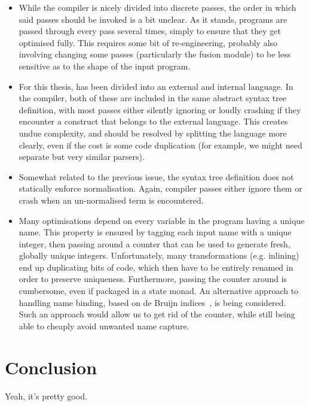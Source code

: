 \begin{itemize}
\item While the compiler is nicely divided into discrete passes, the
  order in which said passes should be invoked is a bit unclear.  As
  it stands, programs are passed through every pass several times,
  simply to ensure that they get optimised fully.  This requires some
  bit of re-engineering, probably also involving changing some passes
  (particularly the fusion module) to be less sensitive as to the
  shape of the input program.

\item For this thesis, \LO{} has been divided into an external and
  internal language.  In the compiler, both of these are included in
  the same abstract syntax tree definition, with most passes either
  silently ignoring or loudly crashing if they encounter a construct
  that belongs to the external language.  This creates undue
  complexity, and should be resolved by splitting the language more
  clearly, even if the cost is some code duplication (for example, we
  might need separate but very similar parsers).

\item Somewhat related to the previous issue, the \LO{} syntax tree
  definition does not statically enforce normalisation.  Again,
  compiler passes either ignore them or crash when an un-normalised
  term is encountered.

\item Many optimisations depend on every variable in the program
  having a unique name.  This property is ensured by tagging each
  input name with a unique integer, then passing around a counter that
  can be used to generate fresh, globally unique integers.
  Unfortunately, many transformations (e.g. inlining) end up
  duplicating bits of code, which then have to be entirely renamed in
  order to preserve uniqueness.  Furthermore, passing the counter
  around is cumbersome, even if packaged in a state monad.  An
  alternative approach to handling name binding, based on de Bruijn
  indices~\cite{McBride:2004:FPI:1017472.1017477}, is being
  considered.  Such an approach would allow us to get rid of the
  counter, while still being able to cheaply avoid unwanted name
  capture.
\end{itemize}

\section{Conclusion}
\label{sec:conclusion}

Yeah, it's pretty good.

